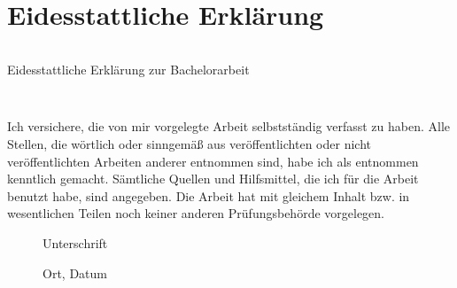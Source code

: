 \section*{Eidesstattliche Erklärung}
\thispagestyle{empty}

\begin{verbatim}

\end{verbatim}

\begin{LARGE}Eidesstattliche Erklärung zur Bachelorarbeit\end{LARGE}
\begin{verbatim}


\end{verbatim}
Ich versichere, die von mir vorgelegte Arbeit selbstständig verfasst zu haben. Alle Stellen, die wörtlich oder sinngemäß aus veröffentlichten oder nicht veröffentlichten Arbeiten anderer entnommen sind, habe ich als entnommen kenntlich gemacht. Sämtliche Quellen und Hilfsmittel, die ich für die Arbeit benutzt habe, sind angegeben. Die Arbeit hat mit gleichem Inhalt bzw. in wesentlichen Teilen noch keiner anderen Prüfungsbehörde vorgelegen.

\begin{figure}[!htb]
    \centering
    \begin{minipage}{.5\textwidth}
        \centering
        \caption*{Unterschrift}
    \end{minipage}%
    \begin{minipage}{.5\textwidth}
        \centering
        \caption*{Ort, Datum}
    \end{minipage}
\end{figure}
